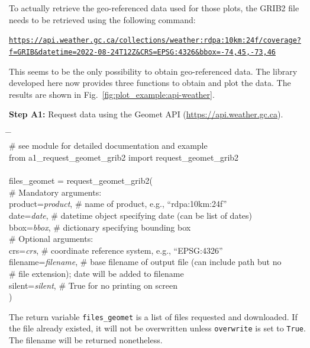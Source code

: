 \documentclass[10pt,a4paper,titlepage,parskip]{scrartcl}
\newenvironment{ttfont}{\fontfamily{\ttdefault}\selectfont}{\par}
\newcommand{\GRAU}[1]{\textcolor{ufzgray2}{#1}}
\begin{document}
To actually retrieve the geo-referenced data used for those plots, the GRIB2 file needs to be retrieved using the following command:
\begin{framed}
\texttt{\url{https://api.weather.gc.ca/collections/weather:rdpa:10km:24f/coverage?f=GRIB&datetime=2022-08-24T12Z&CRS=EPSG:4326&bbox=-74,45,-73,46}}
\end{framed}
This seems to be the only possibility to obtain geo-referenced data. The library developed here now provides three functions to obtain and plot the data. The results are shown in Fig.~\ref{fig:plot_example:api-weather}.

\textbf{Step A1:} Request data using the Geomet API (\url{https://api.weather.gc.ca}).
\begin{framed}
	\vspace*{-1.2cm}
	\begin{ttfont}
	\begin{tabbing}
		\hspace{1.0cm} \= \hspace{3.2cm} \= \kill \\[4pt]
		\GRAU{\# see module for detailed documentation and example}\\
		from a1\_request\_geomet\_grib2 import request\_geomet\_grib2\\
		\\
		files\_geomet = request\_geomet\_grib2(\\
		\> \GRAU{\# Mandatory arguments:}\\
		\> product=\textit{product}, \> \GRAU{\# name of product, e.g., ``rdpa:10km:24f''}\\
		\> date=\textit{date},\> \GRAU{\# datetime object specifying date (can be list of dates)}\\
		\> bbox=\textit{bbox},\> \GRAU{\# dictionary specifying bounding box}\\
		\> \GRAU{\# Optional arguments:}\\
		\> crs=\textit{crs},\> \GRAU{\# coordinate reference system, e.g., ``EPSG:4326''}\\
		\> filename=\textit{filename},\> \GRAU{\# base filename of output file (can include path but no}\\
		\>                           \> \GRAU{\# file extension); date will be added to filename}\\
		\> silent=\textit{silent}, \> \GRAU{\# True for no printing on screen}\\
		\> ) \> 
	\end{tabbing}
	\end{ttfont}
	\vspace*{-0.3cm}
\end{framed}
\vspace*{-0.3cm}
The return variable \texttt{files\_geomet} is a list of files requested and downloaded. If the file already existed, it will not be overwritten unless \texttt{overwrite} is set to \texttt{True}. The filename will be returned nonetheless. 
\end{document}
